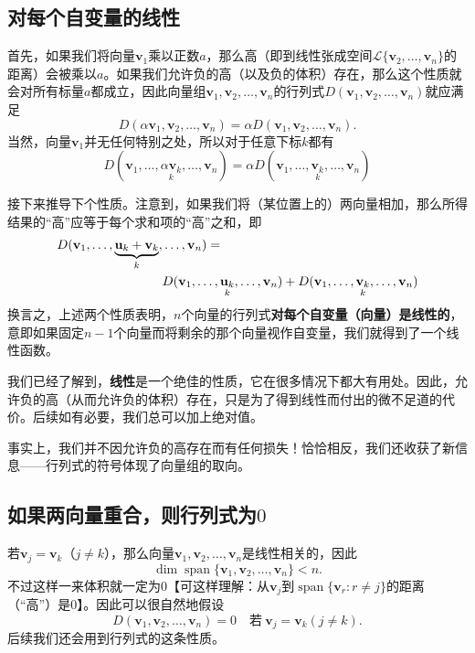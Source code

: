 \subsection{对每个自变量的线性}
首先，如果我们将向量$\mathbf{v}_1$乘以正数$a$，那么高（即到线性张成空间$\mathcal{L}\{\mathbf{v}_{2},\ldots,\mathbf{v}_{n}\}$的距离）会被乘以$a$。如果我们允许负的高（以及负的体积）存在，那么这个性质就会对所有标量$a$都成立，因此向量组$\mathbf{v}_{1},\mathbf{v}_{2},\ldots,\mathbf{v}_{n}$的行列式$D(\mathbf{v}_{1},\mathbf{v}_{2},\ldots,\mathbf{v}_{n})$就应满足\[D(\alpha\mathbf{v}_{1},\mathbf{v}_{2},\ldots,\mathbf{v}_{n})=\alpha D(\mathbf{v}_{1},\mathbf{v}_{2},\ldots,\mathbf{v}_{n}).\]
当然，向量$\mathbf{v}_1$并无任何特别之处，所以对于任意下标$k$都有
\begin{equation}\label{Determinant_linear_1}
  D(\mathbf{v}_1,\ldots,\underset{k}{\alpha\mathbf{v}_k},\ldots,\mathbf{v}_n)=\alpha D(\mathbf{v}_1,\ldots,\underset{k}{\mathbf{v}_k},\ldots,\mathbf{v}_n)
\end{equation}

接下来推导下个性质。注意到，如果我们将（某位置上的）两向量相加，那么所得结果的“高”应等于每个求和项的“高”之和，即
\pagebreak
\begin{align}
  D(\mathbf{v}_1,\ldots,\underbrace{\mathbf{u}_k+\mathbf{v}_k}_k,&\ldots,\mathbf{v}_n)=\label{Determinant_linear_2}\\
  &D(\mathbf{v}_1,\ldots,\underset{k}{\mathbf{u}_k},\ldots,\mathbf{v}_n)+D(\mathbf{v}_1,\ldots,\underset{k}{\mathbf{v}_k},\ldots,\mathbf{v}_n)\notag
\end{align}
换言之，上述两个性质表明，$n$个向量的行列式{\bf 对每个自变量（向量）是线性的}，意即如果固定$n-1$个向量而将剩余的那个向量视作自变量，我们就得到了一个线性函数。

\begin{remark*}
  我们已经了解到，{\bf 线性}是一个绝佳的性质，它在很多情况下都大有用处。因此，允许负的高（从而允许负的体积）存在，只是为了得到线性而付出的微不足道的代价。后续如有必要，我们总可以加上绝对值。

  事实上，我们并不因允许负的高存在而有任何损失！恰恰相反，我们还收获了新信息——行列式的符号体现了向量组的取向。
\end{remark*}

\subsection{如果两向量重合，则行列式为\texorpdfstring{$0$}{0}}

若$\mathbf{v}_{j}=\mathbf{v}_{k}$（$j\ne k$），那么向量$\mathbf{v}_{1},\mathbf{v}_{2},\ldots,\mathbf{v}_{n}$是线性相关的，因此\[\dim\operatorname{span}\{\mathbf{v}_1,\mathbf{v}_2,\ldots,\mathbf{v}_n\}<n.\]
不过这样一来体积就一定为$0$【可这样理解：从$\mathbf{v}_j$到$\operatorname{span}\{\mathbf{v}_{r}:r\neq j\}$的距离（“高”）是$0$】。因此可以很自然地假设
\begin{equation}\label{Determinant_0}
  D(\mathbf{v}_1,\mathbf{v}_2,\ldots,\mathbf{v}_n)=0\quad\text{若}~\mathbf{v}_j=\mathbf{v}_k(j\neq k).
\end{equation}
后续我们还会用到行列式的这条性质。

